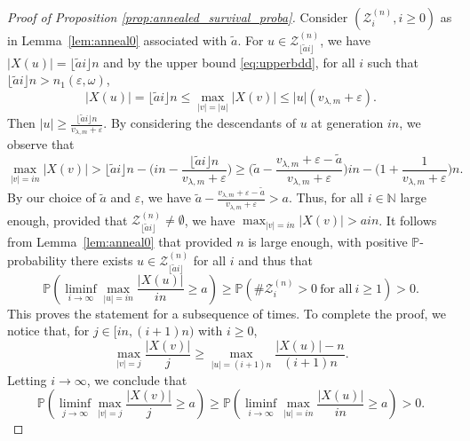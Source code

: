 \documentclass[11 pt]{article}
\theoremstyle{definition}
\numberwithin{equation}{section}
\newcommand{\NN}{\mathbb{N}}
\newcommand{\PP}{\mathbb{P}} %
\begin{document}
\begin{proof}[Proof of Proposition \ref{prop:annealed_survival_proba}]
	Consider $(\mathcal{Z}^{(n)}_i, i\ge 0)$ as in Lemma~\ref{lem:anneal0} associated with $\tilde{a}$. 
	For $u\in \mathcal{Z}^{(n)}_{\lfloor \tilde{a} i\rfloor}$, we  have $|X(u)| = \lfloor \tilde{a} i\rfloor n $
	and by the upper bound \eqref{eq:upperbdd}, for all $i$ such that $\lfloor\tilde{a} i\rfloor n >n_1(\varepsilon,\omega)$,  
	\begin{equation}\label{eq:upperbdd-1}
	|X(u)| = \lfloor \tilde{a} i\rfloor n \le \max_{|v| = |u| } |X(v)| \le |u| (v_{\lambda, m}+ \varepsilon).
\end{equation}
Then $ |u|  \ge \frac{\lfloor \tilde{a} i\rfloor n}{v_{\lambda, m}+ \varepsilon}$. 
	By considering the descendants of $u$ at generation $in$, we	observe that 
	\[
	\max_{|v| = i n } |X(v)|
	>\lfloor \tilde{a} i\rfloor n - \Big(in -\frac{\lfloor \tilde{a} i\rfloor n}{v_{\lambda, m}+ \varepsilon}\Big)  
	\ge \Big( \tilde{a} - \frac{v_{\lambda, m}+ \varepsilon-\tilde{a}}{v_{\lambda, m}+ \varepsilon} \Big) i n 
		-\Big(1+\frac{1}{v_{\lambda, m}+ \varepsilon}\Big) n.
	\]
	By our choice of $\tilde{a}$ and $\varepsilon$, we have $\tilde{a} - \frac{v_{\lambda, m}+ \varepsilon-\tilde{a}}{v_{\lambda, m}+ \varepsilon}>a$. Thus, for all $i\in \NN$ large enough, provided that $\mathcal{Z}^{(n)}_{\lfloor \tilde{a} i\rfloor}\ne \emptyset$, we have
	$\max_{|v| = i n } |X(v)|
	> a i n$. 
	It follows from	Lemma~\ref{lem:anneal0} that provided $n$ is large enough, with positive $\PP$-probability there exists  $u \in \mathcal{Z}^{(n)}_{\lfloor \tilde{a} i\rfloor}$ for all $i$ and thus  that 
		\begin{equation*}
				\PP\left(\liminf_{i \to \infty} \max_{|u| = i n } \frac{|X(u)|}{i n} \ge a  \right) \ge 	\PP(\#\mathcal{Z}^{(n)}_{i}>0 ~\text{for all}~ i\ge 1)> 0.  
			\end{equation*}
		This proves the statement for a subsequence of times.
		To complete the proof, we notice that, for $j\in [in, (i+1)n)$ with $i\ge 0$,  
		\[
		\max_{|v| = j } \frac{|X(v)|}{j} \ge \max_{|u| = (i+1) n } \frac{|X(u)| - n}{(i+1) n}. 
		\]
		Letting $i\to \infty$, we conclude that
		\[
				\PP\left(\liminf_{j \to \infty} \max_{|v| = j } \frac{|X(v)|}{j} \ge a  \right)\ge 			\PP\left(\liminf_{i \to \infty} \max_{|u| = i n } \frac{|X(u)|}{i n} \ge a  \right) > 0. 
		\]
\end{proof}
\end{document}

